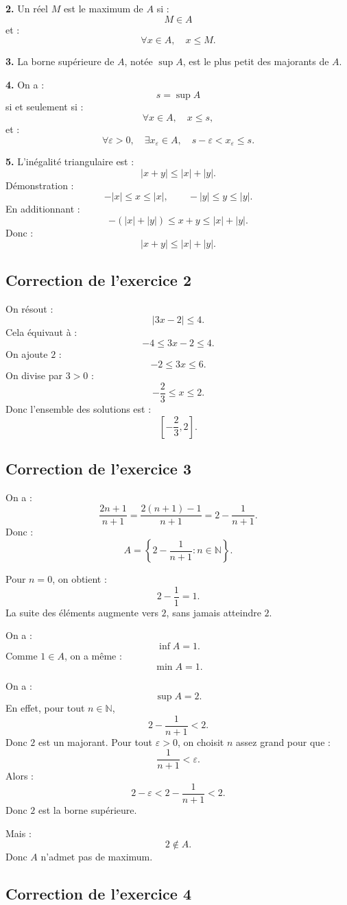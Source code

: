 \documentclass[11pt,a4paper]{article}
\newcommand{\N}{\mathbb N}
\newcommand{\abs}[1]{\left|#1\right|}
\begin{document}
\textbf{2.}  
Un réel \(M\) est le maximum de \(A\) si :
\[
M\in A
\]
et :
\[
\forall x\in A,\quad x\leq M.
\]

\textbf{3.}  
La borne supérieure de \(A\), notée \(\sup A\), est le plus petit des majorants de \(A\).

\textbf{4.}  
On a :
\[
s=\sup A
\]
si et seulement si :
\[
\forall x\in A,\quad x\leq s,
\]
et :
\[
\forall \varepsilon>0,\quad \exists x_\varepsilon\in A,\quad s-\varepsilon<x_\varepsilon\leq s.
\]

\textbf{5.}  
L'inégalité triangulaire est :
\[
\abs{x+y}\leq \abs{x}+\abs{y}.
\]
Démonstration :
\[
-\abs{x}\leq x\leq\abs{x},
\qquad
-\abs{y}\leq y\leq\abs{y}.
\]
En additionnant :
\[
-(\abs{x}+\abs{y})\leq x+y\leq \abs{x}+\abs{y}.
\]
Donc :
\[
\abs{x+y}\leq \abs{x}+\abs{y}.
\]

\subsection*{Correction de l'exercice 2}

On résout :
\[
\abs{3x-2}\leq4.
\]
Cela équivaut à :
\[
-4\leq3x-2\leq4.
\]
On ajoute \(2\) :
\[
-2\leq3x\leq6.
\]
On divise par \(3>0\) :
\[
-\frac23\leq x\leq2.
\]
Donc l'ensemble des solutions est :
\[
\left[-\frac23,2\right].
\]

\subsection*{Correction de l'exercice 3}

On a :
\[
\frac{2n+1}{n+1}
=
\frac{2(n+1)-1}{n+1}
=
2-\frac1{n+1}.
\]
Donc :
\[
A=\left\{2-\frac1{n+1}: n\in\N\right\}.
\]

Pour \(n=0\), on obtient :
\[
2-\frac1{1}=1.
\]
La suite des éléments augmente vers \(2\), sans jamais atteindre \(2\).

On a :
\[
\inf A=1.
\]
Comme \(1\in A\), on a même :
\[
\min A=1.
\]

On a :
\[
\sup A=2.
\]
En effet, pour tout \(n\in\N\),
\[
2-\frac1{n+1}<2.
\]
Donc \(2\) est un majorant.  
Pour tout \(\varepsilon>0\), on choisit \(n\) assez grand pour que :
\[
\frac1{n+1}<\varepsilon.
\]
Alors :
\[
2-\varepsilon<2-\frac1{n+1}<2.
\]
Donc \(2\) est la borne supérieure.

Mais :
\[
2\notin A.
\]
Donc \(A\) n'admet pas de maximum.

\subsection*{Correction de l'exercice 4}
\end{document}
